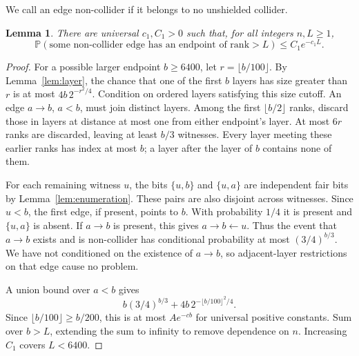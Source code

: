 \documentclass[11pt]{article}
\newtheorem{lemma}[theorem]{Lemma}
\theoremstyle{remark}
\newcommand{\Prob}{\mathbb P}
\begin{document}
We call an edge non-collider if it belongs to no unshielded collider.
\begin{lemma}\label{lem:deep}
There are universal $c_1,C_1>0$ such that, for all integers $n,L\ge1$,
\begin{equation}\label{eq:deep}
 \Prob(\text{some non-collider edge has an endpoint of rank}>L)
 \le C_1e^{-c_1L}.
\end{equation}
\end{lemma}
\begin{proof}
For a possible larger endpoint $b\ge6400$, let $r=\lfloor b/100\rfloor$.
By Lemma~\ref{lem:layer}, the chance that one of the first $b$ layers has
size greater than $r$ is at most $4b\,2^{-r^2/4}$. Condition on ordered
layers satisfying this size cutoff. An edge $a\to b$, $a<b$, must join
distinct layers. Among the first $\lfloor b/2\rfloor$ ranks, discard those
in layers at distance at most one from either endpoint's layer.
At most $6r$ ranks are discarded, leaving at least $b/3$ witnesses.
Every layer meeting these earlier ranks has index at most $b$; a layer
after the layer of $b$ contains none of them.

For each remaining witness $u$, the bits $\{u,b\}$ and $\{u,a\}$ are
independent fair bits by Lemma~\ref{lem:enumeration}. These pairs are also
disjoint across witnesses. Since $u<b$, the first edge, if present,
points to $b$. With probability $1/4$ it is present and $\{u,a\}$ is
absent. If $a\to b$ is present, this gives $a\to b\leftarrow u$.
Thus the event that $a\to b$ exists and is non-collider has conditional
probability at most $(3/4)^{b/3}$. We have not conditioned on the existence
of $a\to b$, so adjacent-layer restrictions on that edge cause no problem.

A union bound over $a<b$ gives
\[
 b(3/4)^{b/3}+4b\,2^{-\lfloor b/100\rfloor^2/4}.
\]
Since $\lfloor b/100\rfloor\ge b/200$, this is at most $A e^{-cb}$
for universal positive constants. Sum over $b>L$, extending the sum to
infinity to remove dependence on $n$. Increasing $C_1$ covers $L<6400$.
\end{proof}
\end{document}
